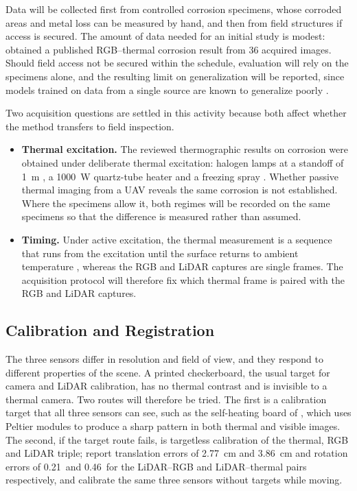 Data will be collected first from controlled corrosion specimens, whose corroded
areas and metal loss can be measured by hand, and then from field structures if
access is secured. The amount of data needed for an initial study is modest:
\citet{Lim2021} obtained a published RGB--thermal corrosion result from 36
acquired images. Should field access not be secured within the schedule,
evaluation will rely on the specimens alone, and the resulting limit on
generalization will be reported, since models trained on data from a single
source are known to generalize poorly \citep{Nash2022}.

Two acquisition questions are settled in this activity because both affect
whether the method transfers to field inspection.
\begin{itemize}
  \item \textbf{Thermal excitation.} The reviewed thermographic results on
        corrosion were obtained under deliberate thermal excitation: halogen
        lamps at a standoff of 1~m \citep{Lim2021}, a 1000~W quartz-tube heater
        \citep{Elizalde2023} and a freezing spray \citep{Doshvarpassand2022}.
        Whether passive thermal imaging from a UAV reveals the same corrosion is
        not established. Where the specimens allow it, both regimes will be
        recorded on the same specimens so that the difference is measured
        rather than assumed.
  \item \textbf{Timing.} Under active excitation, the thermal measurement is a
        sequence that runs from the excitation until the surface returns to
        ambient temperature \citep{Doshvarpassand2022}, whereas the RGB and LiDAR
        captures are single frames. The acquisition protocol will therefore fix
        which thermal frame is paired with the RGB and LiDAR captures.
\end{itemize}

\subsection{Calibration and Registration}
\label{sec:registration}

The three sensors differ in resolution and field of view, and they respond to
different properties of the scene. A printed checkerboard, the usual target for
camera and LiDAR calibration, has no thermal contrast and is invisible to a
thermal camera. Two routes will therefore be tried. The first is a calibration
target that all three sensors can see, such as the self-heating board of
\citet{Nooralishahi2022}, which uses Peltier modules to produce a sharp pattern
in both thermal and visible images. The second, if the target route fails, is
targetless calibration of the thermal, RGB and LiDAR triple; \citet{Yang2024}
report translation errors of 2.77~cm and 3.86~cm and rotation errors of
0.21\textdegree\ and 0.46\textdegree\ for the LiDAR--RGB and LiDAR--thermal pairs
respectively, and \citet{Tran2024} calibrate the same three sensors without
targets while moving.

